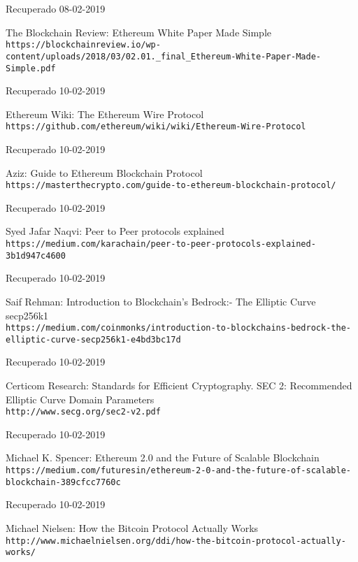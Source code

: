 \documentclass[a4paper,12pt,times,print,index]{Classes/PhDThesisPSnPDF}
\begin{document}
\begin{thebibliography}{40}
		Recuperado 08-02-2019
		
		The Blockchain Review: Ethereum White Paper Made Simple
		\\\texttt{https://blockchainreview.io/wp-content/uploads/2018/03/02.01.\_final\_Ethereum-White-Paper-Made-Simple.pdf}
		
		Recuperado 10-02-2019
	
		Ethereum Wiki: The Ethereum Wire Protocol
		\\\texttt{https://github.com/ethereum/wiki/wiki/Ethereum-Wire-Protocol}
		
		Recuperado 10-02-2019
	
		Aziz: Guide to Ethereum Blockchain Protocol
		\\\texttt{https://masterthecrypto.com/guide-to-ethereum-blockchain-protocol/}
		
		Recuperado 10-02-2019
		
		Syed Jafar Naqvi: Peer to Peer protocols explained	
		\\\texttt{https://medium.com/karachain/peer-to-peer-protocols-explained-3b1d947c4600}
		
		Recuperado 10-02-2019
	
		Saif Rehman: Introduction to Blockchain’s Bedrock:- The Elliptic Curve secp256k1
		\\\texttt{https://medium.com/coinmonks/introduction-to-blockchains-bedrock-the-elliptic-curve-secp256k1-e4bd3bc17d}
		
		Recuperado 10-02-2019

		Certicom Research: Standards for Efficient Cryptography. SEC 2: Recommended Elliptic Curve Domain Parameters
		\\\texttt{http://www.secg.org/sec2-v2.pdf}	
		
		Recuperado 10-02-2019
		
		Michael K. Spencer: Ethereum 2.0 and the Future of Scalable Blockchain
		\\\texttt{https://medium.com/futuresin/ethereum-2-0-and-the-future-of-scalable-blockchain-389cfcc7760c}	
		
		Recuperado 10-02-2019
		
		Michael Nielsen: How the Bitcoin Protocol Actually Works
		\\\texttt{http://www.michaelnielsen.org/ddi/how-the-bitcoin-protocol-actually-works/}
		

\end{thebibliography}
\end{document}
